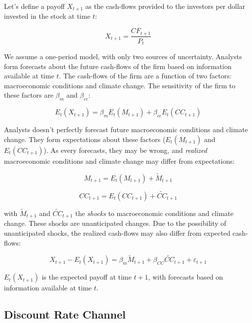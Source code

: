 Let's define a payoff $X_{t+1}$ as the 
cash-flows provided to the investors per dollar invested in the stock at time $t$:

\begin{equation}
    X_{t+1} = \frac{CF_{t+1}}{P_t}
\end{equation}

We assume a one-period model, with only 
two sources of uncertainty. 
Analysts form forecasts 
about the future cash-flows of the firm
based on information available at time $t$.
The cash-flows of the firm are a function of
two factors: macroeconomic conditions and climate change.
The sensitivity of the firm to these factors are $\beta_m$ and $\beta_{cc}$:

\begin{equation}
    E_t(X_{t+1}) = \beta_m E_t(M_{t+1})
    + \beta_{cc} E_t(CC_{t+1})
\end{equation}

Analysts doesn't perfectly forecast future macroeconomic conditions
and climate change. They form expectations about these factors 
($E_t(M_{t+1})$ and $E_t(CC_{t+1})$).
As every forecasts, they may be wrong, 
and \textit{realized} macroeconomic conditions and climate change
may differ from expectations:

\begin{equation}
    M_{t+1} = E_t(M_{t+1}) + \tilde{M}_{t+1}
\end{equation}

\begin{equation}
    CC_{t+1} = E_t(CC_{t+1}) + \tilde{CC}_{t+1}
\end{equation}

with $\tilde{M}_{t+1}$ and $\tilde{CC}_{t+1}$ the \textit{shocks} to macroeconomic conditions 
and climate change. These shocks are unanticipated
changes.
Due to the possibility of unanticipated shocks,
the realized cash-flows may also differ from expected cash-flows:

\begin{equation}
    X_{t+1} - E_{t}(X_{t+1}) = \beta_m \tilde{M}_{t+1} + \beta_{CC} \tilde{CC}_{t+1} + \varepsilon_{t+1}
\end{equation}

$E_t(X_{t+1})$ is the expected payoff at time $t+1$,
with forecasts based on information available at time $t$.

\subsection{Discount Rate Channel}

